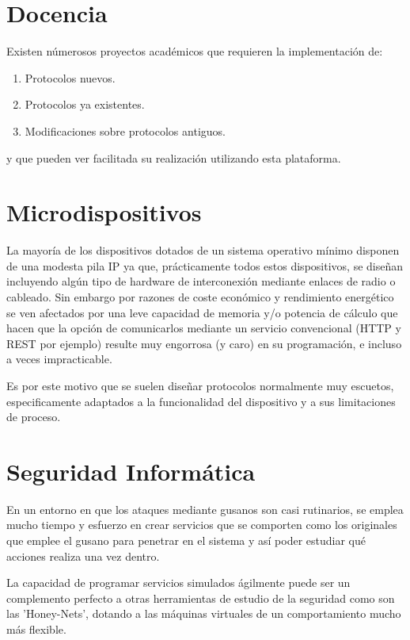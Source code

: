 \documentclass[a4paper,spanish,12pt]{book}
\begin{document}
\section{Docencia}
Existen númerosos proyectos acad\'emicos que requieren la implementaci\'on de:
\begin{enumerate}
	\item Protocolos nuevos.
	\item Protocolos ya existentes.
	\item Modificaciones sobre protocolos antiguos. 
\end{enumerate}

y que pueden ver facilitada su realización utilizando esta plataforma.

\section{Microdispositivos}
La mayor\'ia de los dispositivos dotados de un sistema operativo m\'inimo disponen de una modesta pila IP ya que, prácticamente todos estos dispositivos, se dise\~{n}an incluyendo algún tipo de hardware de interconexi\'on mediante enlaces de radio o cableado. Sin embargo por razones de coste económico y rendimiento energ\'etico se ven afectados por una leve capacidad de memoria y/o potencia de c\'alculo que hacen que la opción de comunicarlos mediante un servicio convencional (HTTP y REST por ejemplo) resulte muy engorrosa (y caro) en su programaci\'on, e incluso a veces impracticable.

Es por este motivo que se suelen dise\~{n}ar protocolos normalmente muy escuetos, especificamente adaptados a la funcionalidad del dispositivo y a sus limitaciones de proceso.

\section{Seguridad Inform\'atica}
En un entorno en que los ataques mediante gusanos son casi rutinarios, se emplea mucho tiempo y esfuerzo en crear servicios que se comporten como los originales que emplee el gusano para penetrar en el sistema y as\'i poder estudiar qué acciones realiza una vez dentro.

La capacidad de programar servicios simulados ágilmente puede ser un complemento perfecto a otras herramientas de estudio de la seguridad como son las 'Honey-Nets', dotando a las m\'aquinas virtuales de un comportamiento mucho m\'as flexible.
\end{document}
